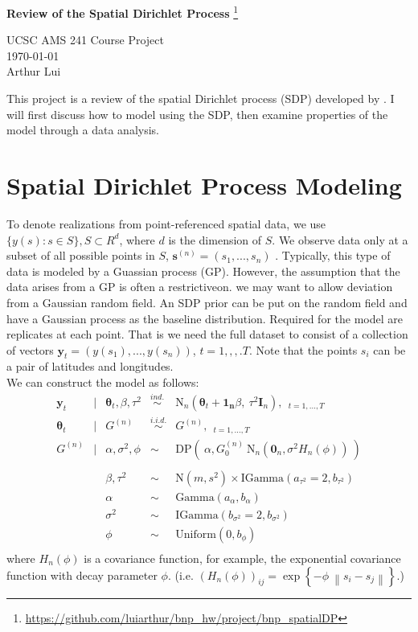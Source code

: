 \documentclass[11pt]{article}
\def\wl{\par \vspace{\baselineskip}\noindent}
\def\hline{ \textcolor{lgrey}{\hrulefill} }
\newcommand{\m}[1]{\mathbf{\bm{#1}}} %
\def\norm#1{\left\lVert#1\right\rVert}
\begin{document}
\begin{center}
  {\huge \textbf{Review of the Spatial Dirichlet Process}
    \footnote{\url{https://github.com/luiarthur/bnp_hw/project/bnp_spatialDP}}
  }\\
  \wl
  UCSC AMS 241 Course Project\\
  \noindent\today\\
  Arthur Lui\\
  \hline
\end{center}

\noindent
This project is a review of the spatial Dirichlet process (SDP) developed by
\cite{sdp}. I will first discuss how to model using the SDP, then examine
properties of the model through a data analysis.

\section{Spatial Dirichlet Process Modeling}
\noindent
To denote realizations from point-referenced spatial data, we use $\{y(s): s\in
S\}, S \subset R^d$, where $d$ is the dimension of $S$. We observe data only at
a subset of all possible points in $S$, $\m s^{(n)}=(s_1,...,s_n)$ . Typically,
this type of data is modeled by a Guassian process (GP). However, the
assumption that the data arises from a GP is often a restrictiveon.  we may
want to allow deviation from a Gaussian random field. An SDP prior can be put
on the random field and have a Gaussian process as the baseline distribution.
Required for the model are replicates at each point. That is we need the full
dataset to consist of a collection of vectors $\m y_t = (y(s_1),...,y(s_n))$,
$t=1,,,.T$. Note that the points $s_i$ can be a pair of latitudes and
longitudes.\\

\noindent
We can construct the model as follows:
\[
  \begin{array}{rclcl}
    \m y_t &|& \m\theta_t,\beta,\tau^2 &\overset{ind.}{\sim}&\text{N}_n(\m\theta_t+ \m{1_n}\beta,
    ~\tau^2\m I_n), ~~_{t=1,...,T}\\
    \m\theta_t &|& G^{(n)} &\overset{i.i.d.}{\sim}& G^{(n)}, ~~_{t=1,...,T} \\
    G^{(n)} &|& \alpha, \sigma^2, \phi &\sim&
      \text{DP}(~\alpha,G_0^{(n)}~\text{N}_n(\m 0_n,\sigma^2H_n(\phi)) ~) \\
    \\
            && \beta, \tau^2 &\sim& \text{N}(m,s^2) \times \text{IGamma}(a_{\tau^2}=2,b_{\tau^2}) \\
            && \alpha &\sim& \text{Gamma}(a_\alpha,b_\alpha) \\
            && \sigma^2 &\sim& \text{IGamma}(b_{\sigma^2}=2,b_{\sigma^2}) \\
            && \phi &\sim& \text{Uniform}(0,b_\phi) \\
  \end{array}
\]
where $H_n(\phi)$ is a covariance function, for example, the exponential
covariance function with decay parameter $\phi$. (i.e.  $(H_n(\phi))_{ij} =
\exp\left\{-\phi~\norm{s_i-s_j}\right\}$.)\\
\end{document}
